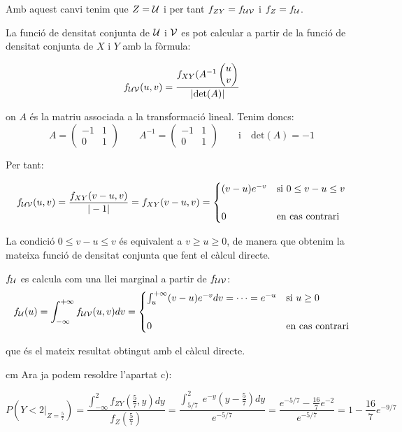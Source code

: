 \documentclass{article}
\begin{document}
Amb aquest canvi tenim que $Z={\cal U}$ i per tant $f_{ZY}=f_{{\cal U}{\cal V}}$ i $f_Z=f_{\cal U}$.

La funci\'o de densitat conjunta de ${\cal U}$ i ${\cal V}$ es pot calcular a partir de la funci\'o de densitat 
conjunta de $X$ i $Y$  amb la f\`ormula:

\[
f_{{\cal U}{\cal V}}(u, v) =
\frac{ f_{XY} ( A^{-1} \begin{pmatrix} u \\ v \end{pmatrix} } { | \mathrm{det}(A) |}
\]

on $A$ \'es la matriu associada a la transformaci\'o lineal. Tenim doncs:
\[
A= \begin{pmatrix} -1 & 1 \\ 0 & 1 \end{pmatrix} 
\qquad 
A^{-1}= \begin{pmatrix} -1 & 1 \\ 0 & 1 \end{pmatrix} 
\qquad 
\text{i}
\quad 
\mathrm{det}(A)=-1
\]

Per tant:

\[
f_{{\cal U}{\cal V}}(u, v) =\frac{ f_{XY} (v-u, v) }{|-1|}=f_{XY} (v-u, v) =
\begin{cases} (v-u) e^{-v} & \text{si } 0 \leq v-u \leq v \\ \\ 0 & \text{en cas contrari} \end{cases}
\]

La condici\'o $0 \leq v-u \leq v$ \'es equivalent a $v \geq u \geq 0$, de manera que obtenim la mateixa 
funci\'o de densitat conjunta que fent el c\`alcul directe.

$f_{\cal U}$ es calcula com una llei marginal a partir de $f_{{\cal U}{\cal V}}$:
\[
f_{\cal U}(u)=\int_{-\infty}^{+\infty} f_{{\cal U}{\cal V}}(u, v)dv = 
\begin{cases} \int_u^{+\infty} (v-u) e^{-v} dv = \cdots = e^{-u} & \text{si } u \geq 0 \\ \\
0 & \text{en cas contrari} \end{cases}
\]

que \'es el mateix resultat obtingut amb el c\`alcul directe.




 cm
Ara ja podem resoldre l'apartat c):

\[
P(Y < 2 |_{Z=\frac{5}{7}})=\frac{ \int_{-\infty}^2 f_{ZY}(\frac{5}{7}, y) dy } {f_Z(\frac{5}{7})}=
\frac{ \int_{5/7}^2 \; e^{-y} (y-\frac{5}{7}) dy}{e^{-5/7}}=
\frac{ e^{-5/7} - \frac{16}{7} e^{-2} }{e^{-5/7}} = 1-\frac{16}{7} e^{-9/7}
\]
\end{document}
